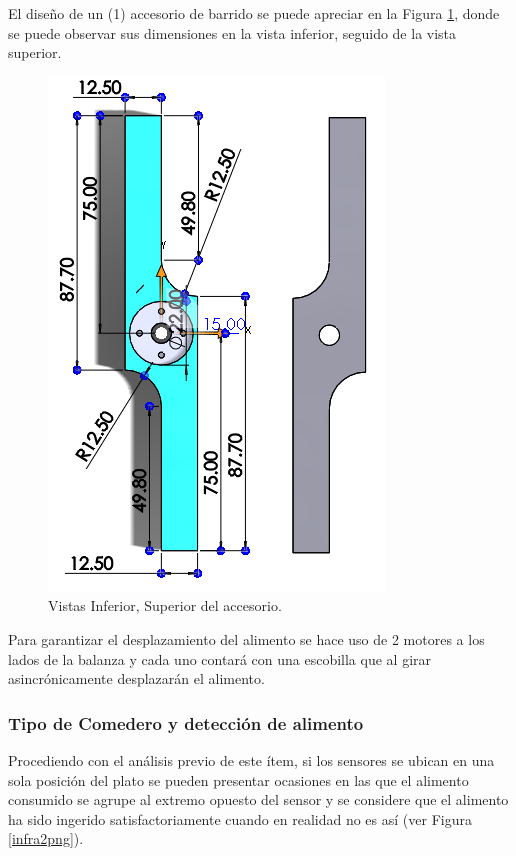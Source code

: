     El diseño de un (1) accesorio de barrido se puede apreciar en la Figura \ref{vistasbarredorpng}, donde se puede observar  sus dimensiones en la vista inferior, seguido de la vista superior.
    
    \begin{figure}[H]
	    \begin{center}
	    	\includegraphics[scale=0.50]{img/vistasbarredor.png}
        \end{center}
	    \caption{Vistas Inferior, Superior del accesorio. \label{vistasbarredorpng}}
    \end{figure}

    Para garantizar el desplazamiento del alimento se hace uso de 2 motores a los lados de la balanza  y cada uno contará con una escobilla que al girar asincrónicamente desplazarán el alimento. 
    

    
    \subsubsection{Tipo de Comedero y detección de alimento}  \label{detectcomedero}

    Procediendo con el análisis previo de este ítem, si los sensores se ubican en una sola posición del plato se pueden presentar ocasiones en las que el alimento consumido se agrupe al extremo opuesto del sensor y se considere que el alimento ha sido ingerido satisfactoriamente cuando en realidad no es así (ver Figura \ref{infra2png}).

